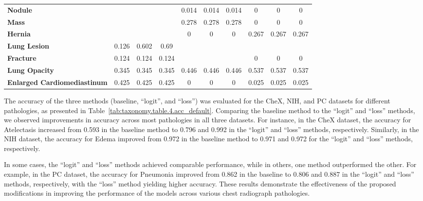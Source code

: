 \begin{table}[]
{\begin{tabular}{lccccccccc}
\textbf{Nodule}                       &       &       &       & 0.014 & 0.014 & 0.014 & 0     & 0     & 0     \\
\textbf{Mass}                         &       &       &       & 0.278 & 0.278 & 0.278 & 0     & 0     & 0     \\
\textbf{Hernia}                       &       &       &       & 0     & 0     & 0     & 0.267 & 0.267 & 0.267 \\
\textbf{Lung Lesion}                  & 0.126 & 0.602 & 0.69  &       &       &       &       &       &       \\
\textbf{Fracture}                     & 0.124 & 0.124 & 0.124 &       &       &       & 0     & 0     & 0     \\
\textbf{Lung Opacity}                 & 0.345 & 0.345 & 0.345 & 0.446 & 0.446 & 0.446 & 0.537 & 0.537 & 0.537 \\
\textbf{Enlarged   Cardiomediastinum} & 0.425 & 0.425 & 0.425 & 0     & 0     & 0     & 0.025 & 0.025 & 0.025
\end{tabular}%
}\label{tab:taxonomy.table.3.f1}
\end{table}


The accuracy of the three methods (baseline, ``logit'', and ``loss'') was evaluated for the CheX, NIH, and PC datasets for different pathologies, as presented in Table~\ref{tab:taxonomy.table.4.acc_default}. Comparing the baseline method to the ``logit'' and ``loss'' methods, we observed improvements in accuracy across most pathologies in all three datasets. For instance, in the CheX dataset, the accuracy for Atelectasis increased from 0.593 in the baseline method to 0.796 and 0.992 in the ``logit'' and ``loss'' methods, respectively. Similarly, in the NIH dataset, the accuracy for Edema improved from 0.972 in the baseline method to 0.971 and 0.972 for the ``logit'' and ``loss'' methods, respectively.

In some cases, the ``logit'' and ``loss'' methods achieved comparable performance, while in others, one method outperformed the other. For example, in the PC dataset, the accuracy for Pneumonia improved from 0.862 in the baseline to 0.806 and 0.887 in the ``logit'' and ``loss'' methods, respectively, with the ``loss'' method yielding higher accuracy. These results demonstrate the effectiveness of the proposed modifications in improving the performance of the models across various chest radiograph pathologies.


